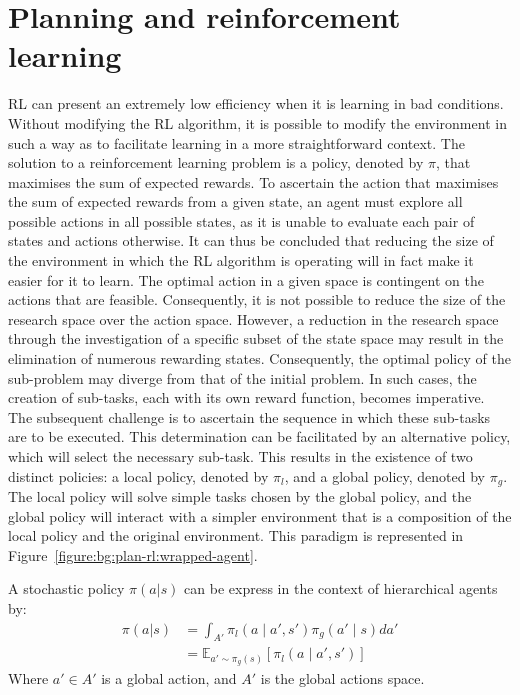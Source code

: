 \section{Planning and reinforcement learning}\label{section:bg:planning-rl}

RL can present an extremely low efficiency when it is learning in bad conditions.
Without modifying the RL algorithm, it is possible to modify the environment in such a way as to facilitate learning
in a more straightforward context.
The solution to a reinforcement learning problem is a policy, denoted by $\pi$, that maximises the sum of expected rewards.
To ascertain the action that maximises the sum of expected rewards from a given state, an agent must explore all
possible actions in all possible states, as it is unable to evaluate each pair of states and actions otherwise.
It can thus be concluded that reducing the size of the environment in which the RL algorithm is operating will in fact
make it easier for it to learn.
The optimal action in a given space is contingent on the actions that are feasible.
Consequently, it is not possible to reduce the size of the research space over the action space.
However, a reduction in the research space through the investigation of a specific subset of the state space may result
in the elimination of numerous rewarding states.
Consequently, the optimal policy of the sub-problem may diverge from that of the initial problem.
In such cases, the creation of sub-tasks, each with its own reward function, becomes imperative.
The subsequent challenge is to ascertain the sequence in which these sub-tasks are to be executed.
This determination can be facilitated by an alternative policy, which will select the necessary sub-task.
This results in the existence of two distinct policies: a local policy, denoted by $\pi_l$, and a global policy, denoted by $\pi_g$.
The local policy will solve simple tasks chosen by the global policy, and the global policy will interact with a
simpler environment that is a composition of the local policy and the original environment.
This paradigm is represented in Figure~\ref{figure:bg:plan-rl:wrapped-agent}.

\begin{definition}
    A stochastic policy $\pi(a|s)$ can be express in the context of hierarchical agents by:
    \begin{equation}
        \begin{split}
            \pi(a|s) &= \int_{A'}\pi_l(a \mid a', s')\pi_g(a' \mid s) da' \\
            &= \mathbb{E}_{a'\sim \pi_g(s)} \left [ \pi_l(a \mid a', s') \right ]
        \end{split}
    \end{equation}
    Where $a' \in A'$ is a global action, and $A'$ is the global actions space.
\end{definition}


